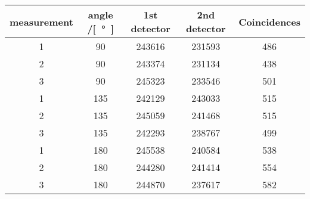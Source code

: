 \begin{tabular}{ccccc}
\toprule
measurement&angle /\si[\degree]&1st detector&2nd detector&Coincidences\\
\midrule
1&90&243616&231593&486\\
2&90&243374&231134&438\\
3&90&245323&233546&501\\
1&135&242129&243033&515\\
2&135&245059&241468&515\\
3&135&242293&238767&499\\
1&180&245538&240584&538\\
2&180&244280&241414&554\\
3&180&244870&237617&582\\
\bottomrule
\end{tabular}